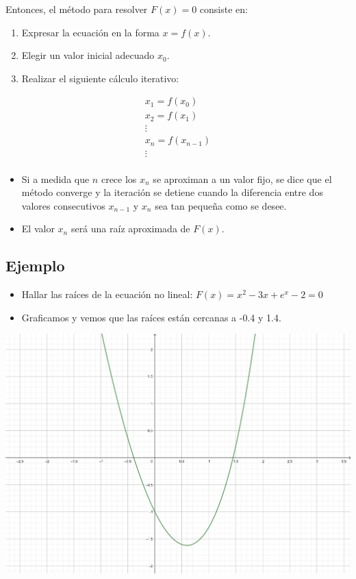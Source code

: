 \documentclass[openany]{book}
\providecommand{\tightlist}{%
  \setlength{\itemsep}{0pt}\setlength{\parskip}{0pt}}
\begin{document}
Entonces, el método para resolver \(F(x) = 0\) consiste en:

\begin{enumerate}
\def\labelenumi{\arabic{enumi}.}
\tightlist
\item
  Expresar la ecuación en la forma \(x = f(x)\).
\item
  Elegir un valor inicial adecuado \(x_0\).
\item
  Realizar el siguiente cálculo iterativo:
\end{enumerate}

\begin{gather*}
x_1 = f(x_0) \\
x_2 = f(x_1) \\
\vdots \\
x_n = f(x_{n-1}) \\
\vdots \\
\end{gather*}

\begin{itemize}
\tightlist
\item
  Si a medida que \(n\) crece los \(x_n\) se aproximan a un valor fijo, se dice que el método converge y la iteración se detiene cuando la diferencia entre dos valores consecutivos \(x_{n-1}\) y \(x_n\) sea tan pequeña como se desee.
\item
  El valor \(x_n\) será una raíz aproximada de \(F(x)\).
\end{itemize}

\hypertarget{ejemplo}{%
\subsection{Ejemplo}\label{ejemplo}}

\begin{itemize}
\tightlist
\item
  Hallar las raíces de la ecuación no lineal: \(F(x) = x^2-3x+e^x-2=0\)
\item
  Graficamos y vemos que las raíces están cercanas a -0.4 y 1.4.
\end{itemize}

\begin{center}\includegraphics[width=0.7\linewidth]{Plots/U2/f1} \end{center}
\end{document}
